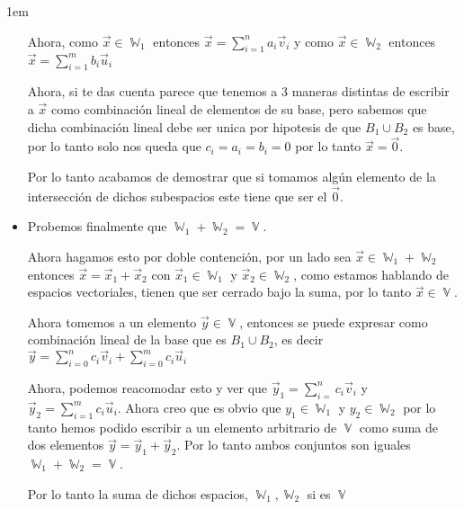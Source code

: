\documentclass[12pt, fleqn]{article}                             %
\newenvironment{SmallIndentation}[1][0.75em]                    %
        {\begin{adjustwidth}{#1}{}\begin{footnotesize}}             %
        {\end{footnotesize}\end{adjustwidth}}                       %
\theoremstyle{break}                                            %
\DeclareMathOperator \VectorSet    {\mathbb{V}}                 %
\DeclareMathOperator \SubVectorSet {\mathbb{W}}                 %
\begin{document}
\begin{SmallIndentation}[1em]
\begin{itemize}
                Ahora, como $\vec x \in \SubVectorSet_1$ entonces $\vec x = \sum_{i=1}^n a_i \vec v_i$
                y como $\vec x \in \SubVectorSet_2$ entonces $\vec x = \sum_{i=1}^m b_i \vec u_i$

                Ahora, si te das cuenta parece que tenemos a 3 maneras distintas de escribir a $\vec x$ como
                combinación lineal de elementos de su base, pero sabemos que dicha combinación lineal debe ser unica por
                hipotesis de que $B_1 \cup B_2$ es base, por lo tanto solo nos queda que $c_i = a_i = b_i = 0$
                por lo tanto $\vec x = \vec 0$.

                Por lo tanto acabamos de demostrar que si tomamos algún elemento de la intersección de dichos subespacios
                este tiene que ser el $\vec 0$.

            \item
                Probemos finalmente que $\SubVectorSet_1 + \SubVectorSet_2 = \VectorSet$.

                Ahora hagamos esto por doble contención, por un lado sea
                $\vec x \in \SubVectorSet_1 + \SubVectorSet_2$ entonces
                $\vec x = \vec x_1 + \vec x_2$ con $\vec x_1 \in \SubVectorSet_1$ y $\vec x_2 \in \SubVectorSet_2$,
                como estamos hablando de espacios vectoriales, tienen que ser cerrado bajo la suma, por lo tanto
                $\vec x \in \VectorSet$.

                Ahora tomemos a un elemento $\vec y \in \VectorSet$, entonces se puede expresar como combinación
                lineal de la base que es $B_1 \cup B_2$, es decir 
                $\vec y = \sum_{i=0}^{n} c_i \vec v_i + \sum_{i=0}^{m} c_i \vec u_i$

                Ahora, podemos reacomodar esto y ver que $\vec y_1 = \sum_{i=}^{n} c_i \vec v_i$ y
                $\vec y_2 = \sum_{i=1}^{m} c_i \vec u_i$.
                Ahora creo que es obvio que $y_1 \in \SubVectorSet_1$ y $y_2 \in \SubVectorSet_2$
                por lo tanto hemos podido escribir a un elemento arbitrario de $\VectorSet$ como 
                suma de dos elementos $\vec y = \vec y_1 + \vec y_2$. Por lo tanto ambos conjuntos son iguales 
                $\SubVectorSet_1 + \SubVectorSet_2 = \VectorSet$.

                Por lo tanto la suma de dichos espacios, $\SubVectorSet_1, \SubVectorSet_2$ si es $\VectorSet$                                   

        \end{itemize}


    \end{SmallIndentation}
\end{document}
